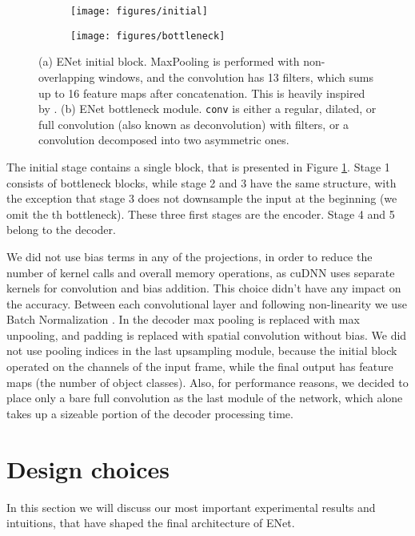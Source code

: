 \documentclass{article}
\begin{document}
\begin{figure}[!t]
\begin{subfigure}{.5\textwidth}
  \centering
  \texttt{[image: figures/initial]}
  \\
  \caption{}
  \label{fig:initial}
\end{subfigure}\begin{subfigure}{.5\textwidth}
  \centering
  \texttt{[image: figures/bottleneck]}
  \caption{}
  \label{fig:bottleneck}
\end{subfigure}
  \vspace{0.05in}
  \caption{
          (a) ENet initial block. MaxPooling is performed with non-overlapping  windows, and the convolution has 13 filters, which sums up to 16 feature maps after concatenation. This is heavily inspired by \cite{szegedy2015rethinking}.
          (b) ENet bottleneck module. \texttt{conv} is either a regular, dilated, or full convolution (also known as deconvolution) with  filters, or a  convolution decomposed into two asymmetric ones.}
\label{fig:modules}
\end{figure}

The initial stage contains a single block, that is presented in Figure \ref{fig:initial}.
Stage 1 consists of  bottleneck blocks, while stage 2 and 3 have the same structure, with the exception that stage 3 does not downsample the input at the beginning (we omit the th bottleneck). These three first stages are the encoder. Stage 4 and 5 belong to the decoder.

We did not use bias terms in any of the projections, in order to reduce the number of kernel calls and overall memory operations, as cuDNN \cite{chetlur2014cudnn} uses separate kernels for convolution and bias addition.
This choice didn't have any impact on the accuracy.
Between each convolutional layer and following non-linearity we use Batch Normalization \cite{ioffe2015batchnorm}.
In the decoder max pooling is replaced with max unpooling, and padding is replaced with spatial convolution without bias.
We did not use pooling indices in the last upsampling module, because the initial block operated on the  channels of the input frame, while the final output has  feature maps (the number of object classes).
Also, for performance reasons, we decided to place only a bare full convolution as the last module of the network, which alone takes up a sizeable portion of the decoder processing time.

\section{Design choices} \label{design}
In this section we will discuss our most important experimental results and intuitions, that have shaped the final architecture of ENet.
\end{document}
